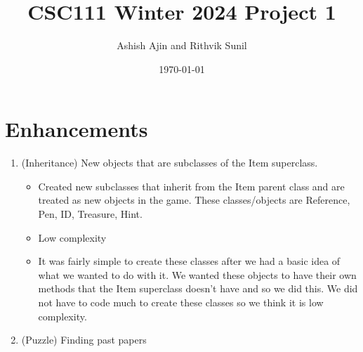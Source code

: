 \documentclass[11pt]{article}
\title{CSC111 Winter 2024 Project 1}
\author{Ashish Ajin and Rithvik Sunil}
\date{\today}
\begin{document}
\maketitle

\section*{Enhancements}


\begin{enumerate}

\item (Inheritance) New objects that are subclasses of the Item superclass.

	\begin{itemize}
        \item Created new subclasses that inherit from the Item parent class and are treated as new objects in the game. These classes/objects are Reference, Pen, ID, Treasure, Hint.
        \item Low complexity
        \item It was fairly simple to create these classes after we had a basic idea of what we wanted to do with it. We wanted these objects to have their own methods that the Item superclass doesn't have and so we did this. We did not have to code much to create these classes so we think it is low complexity.
        \end{itemize}
        
\item (Puzzle) Finding past papers


\end{enumerate}
\end{document}
